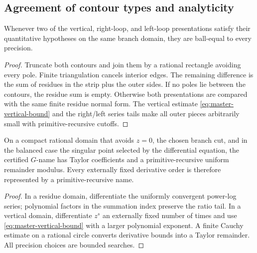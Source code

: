 \subsection{Agreement of contour types and analyticity}

\begin{theorem}\label{thm:contour-agreement}
Whenever two of the vertical, right-loop, and left-loop presentations satisfy
their quantitative hypotheses on the same branch domain, they are ball-equal
to every precision.
\end{theorem}
\begin{proof}
Truncate both contours and join them by a rational rectangle avoiding every
pole.  Finite triangulation cancels interior edges.  The remaining difference
is the sum of residues in the strip plus the outer sides.  If no poles lie
between the contours, the residue sum is empty.  Otherwise both presentations
are compared with the same finite residue normal form.  The vertical estimate
\eqref{eq:master-vertical-bound} and the right/left series tails make all outer
pieces arbitrarily small with primitive-recursive cutoffs.
\end{proof}

\begin{theorem}\label{thm:analyticity}
On a compact rational domain that avoids $z=0$, the chosen branch cut, and in
the balanced case the singular point selected by the differential equation,
the certified $G$-name has Taylor coefficients and a primitive-recursive
uniform remainder modulus.  Every externally fixed derivative order is
therefore represented by a primitive-recursive name.
\end{theorem}
\begin{proof}
In a residue domain, differentiate the uniformly convergent power-log series;
polynomial factors in the summation index preserve the ratio tail.  In a
vertical domain, differentiate $z^s$ an externally fixed number of times and
use \eqref{eq:master-vertical-bound} with a larger polynomial exponent.  A
finite Cauchy estimate on a rational circle converts derivative bounds into a
Taylor remainder.  All precision choices are bounded searches.
\end{proof}
